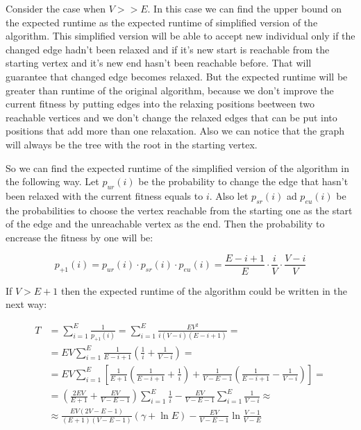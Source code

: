 \documentclass[a4paper]{article}
\begin{document}
 
 Consider the case when $V >> E$. In this case we can find the upper bound on the expected runtime as the expected runtime of simplified version of the algorithm. This simplified version will be able to accept new individual only if the changed edge hadn't been relaxed and if it's new start is reachable from the starting vertex and it's new end hasn't been reachable before. That will guarantee that changed edge becomes relaxed. But the expected runtime will be greater than runtime of the original algorithm, because we don't improve the current fitness by putting edges into the relaxing positions beetween two reachable vertices and we don't change the relaxed edges that can be put into positions that add more than one relaxation. Also we can notice that the graph will always be the tree with the root in the starting vertex.
 
 So we can find the expected runtime of the simplified version of the algorithm in the following way. Let $p_{ur}(i)$ be the probability to change the edge that hasn't been relaxed with the current fitness equals to $i$. Also let $p_{sr}(i)$ ad $p_{eu}(i)$ be the probabilities to choose the vertex reachable from the starting one as the start of the edge and the unreachable vertex as the end.
 Then the probability to encrease the fitness by one will be:
 
 $$ p_{+1}(i) = p_{ur}(i) \cdot p_{sr}(i) \cdot p_{eu}(i) = \frac{E - i + 1}{E} \cdot \frac{i}{V} \cdot \frac{V - i}{V}$$
 
 If $V > E + 1$ then the expected runtime of the algorithm could be written in the next way:
 
 \begin{align*}
  T & = \sum_{i = 1}^E \frac{1}{p_{+1}(i)} = \sum_{i = 1}^E \frac{EV^2}{i(V - i)(E - i + 1)} = \\
    & = EV \sum_{i = 1}^E \frac{1}{E - i + 1} \left(\frac{1}{i} + \frac{1}{V - i} \right) = \\
    & = EV \sum_{i = 1}^E \left[ \frac{1}{E + 1} \left( \frac{1}{E - i + 1} + \frac{1}{i}\right) + \frac{1}{V - E - 1} \left( \frac{1}{E - i + 1} - \frac{1}{V - i} \right)\right] = \\
    & = \left( \frac{2EV}{E + 1} + \frac{EV}{V - E - 1}\right) \sum_{i = 1}^E \frac{1}{i} - \frac{EV}{V - E - 1} \sum_{i = 1}^E \frac{1}{V - i} \approx \\
    & \approx \frac{EV(2V - E - 1)}{(E + 1)(V - E - 1)}(\gamma + \ln{E}) - \frac{EV}{V - E - 1} \ln \frac{V - 1}{V - E}
 \end{align*}
 
\end{document}
